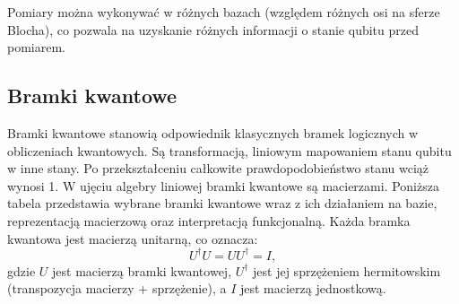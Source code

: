 Pomiary można wykonywać w różnych bazach (względem różnych osi na sferze Blocha), co pozwala na uzyskanie różnych informacji o stanie qubitu przed pomiarem.

\subsection{Bramki kwantowe}\cite{quantum_intro}
Bramki kwantowe stanowią odpowiednik klasycznych bramek logicznych w obliczeniach kwantowych. Są transformacją, liniowym mapowaniem stanu qubitu w inne stany. Po przekształceniu całkowite prawdopodobieństwo stanu wciąż wynosi 1. W ujęciu algebry liniowej bramki kwantowe są macierzami. Poniższa tabela przedstawia wybrane bramki kwantowe wraz z ich działaniem na bazie, reprezentacją macierzową oraz interpretacją funkcjonalną.
Każda bramka kwantowa jest macierzą unitarną, co oznacza:
\[
U^{\dagger} U = U U^{\dagger} = I,
\]
gdzie $U$ jest macierzą bramki kwantowej, $U^{\dagger}$ jest jej sprzężeniem hermitowskim (transpozycja macierzy + sprzężenie), a $I$ jest macierzą jednostkową.


